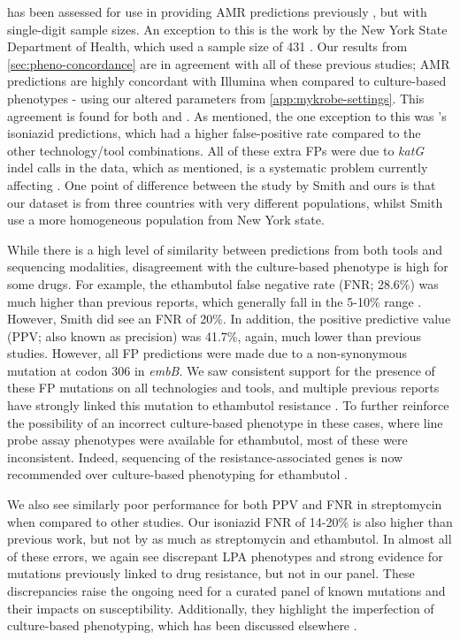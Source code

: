 \ont{} has been assessed for use in providing AMR predictions previously \cite{bradley2015,hunt2019,phelan2019}, but with single-digit sample sizes. An exception to this is the work by the New York State Department of Health, which used a sample size of 431 \cite{smith2020}. Our results from \autoref{sec:pheno-concordance} are in agreement with all of these previous studies; \ont{} AMR predictions are highly concordant with Illumina when compared to culture-based phenotypes - using our altered parameters from \autoref{app:mykrobe-settings}. This agreement is found for both \mykrobe{} and \drprg{}. As mentioned, the one exception to this was \mykrobe{}'s \ont{} isoniazid predictions, which had a higher false-positive rate compared to the other technology/tool combinations. All of these extra FPs were due to \textit{katG} indel calls in the \ont{} data, which as mentioned, is a systematic problem currently affecting \ont{} \cite{watson2019}. One point of difference between the \ont{} study by Smith \etal{} and ours is that our dataset is from three countries with very different \mtb{} populations, whilst Smith \etal{} use a more homogeneous population from New York state. 

While there is a high level of similarity between predictions from both tools and sequencing modalities, disagreement with the culture-based phenotype is high for some drugs. For example, the ethambutol false negative rate (FNR; 28.6\%) was much higher than previous reports, which generally fall in the 5-10\% range \cite{cryptic2018,hunt2019,smith2020}. However, Smith \etal{} did see an FNR of 20\%. In addition, the positive predictive value (PPV; also known as precision) was 41.7\%, again, much lower than previous studies. However, all FP predictions were made due to a non-synonymous mutation at codon 306 in \textit{embB}.  We saw consistent support for the presence of these FP mutations on all technologies and tools, and multiple previous reports have strongly linked this mutation to ethambutol resistance \cite{Maningi2017,Srivastava2009,Brossier2015}. To further reinforce the possibility of an incorrect culture-based phenotype in these cases, where line probe assay phenotypes were available for ethambutol, most of these were inconsistent. Indeed, sequencing of the resistance-associated genes is now recommended over culture-based phenotyping for ethambutol \cite{who2018technical}. 

We also see similarly poor performance for both PPV and FNR in streptomycin when compared to other studies. Our isoniazid FNR of 14-20\% is also higher than previous work, but not by as much as streptomycin and ethambutol. In almost all of these errors, we again see discrepant LPA phenotypes and strong evidence for mutations previously linked to drug resistance, but not in our panel. These discrepancies raise the ongoing need for a curated panel of known mutations and their impacts on susceptibility. Additionally, they highlight the imperfection of culture-based phenotyping, which has been discussed elsewhere \cite{walker2015, who2018technical,cryptic2018}.

